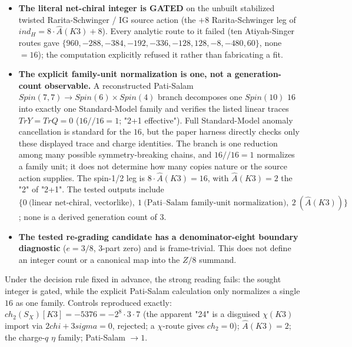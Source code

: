 \documentclass[11pt]{article}
\theoremstyle{remark}
\begin{document}
\begin{itemize}[leftmargin=2em]
\item \textbf{The literal net-chiral integer is GATED} on the unbuilt stabilized twisted Rarita-Schwinger / IG source action (the $+8$ Rarita-Schwinger leg of $ind_H = 8\cdot \widehat{A}(K3) + 8$). Every analytic route to it failed (ten Atiyah-Singer routes gave $\{960,\allowbreak -288,\allowbreak -384,\allowbreak -192,\allowbreak -336,\allowbreak -128,\allowbreak 128,\allowbreak -8,\allowbreak -480,\allowbreak 60\}$, none $= 16$); the computation explicitly refused it rather than fabricating a fit.
\item \textbf{The explicit family-unit normalization is one, not a generation-count observable.} A reconstructed Pati-Salam $Spin(7,7) \to Spin(6) \times Spin(4)$ branch decomposes one $Spin(10)$ $16$ into exactly one Standard-Model family and verifies the listed linear traces $Tr Y = Tr Q = 0$ ($16 // 16 = 1$; "2+1 effective"). Full Standard-Model anomaly cancellation is standard for the $16$, but the paper harness directly checks only these displayed trace and charge identities. The branch is one reduction among many possible symmetry-breaking chains, and $16 // 16 = 1$ normalizes a family unit; it does not determine how many copies nature or the source action supplies. The spin-1/2 leg is $8\cdot \widehat{A}(K3) = 16$, with $\widehat{A}(K3) = 2$ the "2" of "2+1". The tested outputs include $\{0\ \text{(linear net-chiral, vectorlike)},\ 1\ \text{(Pati--Salam family-unit normalization)},\ 2\ (\widehat A(K3))\}$; none is a derived generation count of 3.
\item \textbf{The tested re-grading candidate has a denominator-eight boundary diagnostic} ($e = 3/8$, 3-part zero) and is frame-trivial. This does not define an integer count or a canonical map into the $Z/8$ summand.
\end{itemize}
Under the decision rule fixed in advance, the strong reading fails: the sought integer is gated, while the explicit Pati-Salam calculation only normalizes a single $16$ as one family. Controls reproduced exactly: $ch_2(S_X)[K3] = -5376 = -2^8 \cdot 3 \cdot 7$ (the apparent "24" is a disguised $\chi(K3)$ import via $2chi+3sigma=0$, rejected; a $\chi$-route gives $ch_2 = 0$); $\widehat{A}(K3) = 2$; the charge-$q$ $\eta$ family; Pati-Salam $\to 1$.
\end{document}
